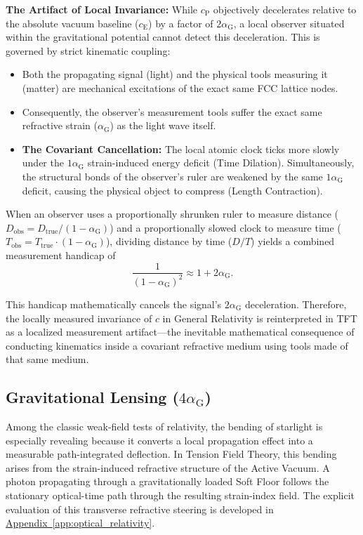 \noindent \textbf{The Artifact of Local Invariance:}
While $c_{\mathrm{P}}$ objectively decelerates relative to the absolute vacuum baseline ($c_{\mathrm{E}}$) by a factor of $2\alpha_{\mathrm{G}}$, a local observer situated within the gravitational potential cannot detect this deceleration. This is governed by strict kinematic coupling:
\begin{itemize}
    \item Both the propagating signal (light) and the physical tools measuring it (matter) are mechanical excitations of the exact same FCC lattice nodes.
    \item Consequently, the observer's measurement tools suffer the exact same refractive strain ($\alpha_{\mathrm{G}}$) as the light wave itself.
    \item \textbf{The Covariant Cancellation:} The local atomic clock ticks more slowly under the $1\alpha_{\mathrm{G}}$ strain-induced energy deficit (Time Dilation). Simultaneously, the structural bonds of the observer's ruler are weakened by the same $1\alpha_{\mathrm{G}}$ deficit, causing the physical object to compress (Length Contraction).
\end{itemize}

When an observer uses a proportionally shrunken ruler to measure distance ($D_{\mathrm{obs}} = D_{\mathrm{true}}/(1 - \alpha_{\mathrm{G}})$) and a proportionally slowed clock to measure time ($T_{\mathrm{obs}} = T_{\mathrm{true}}\cdot(1 - \alpha_{\mathrm{G}})$), dividing distance by time ($D/T$) yields a combined measurement handicap of
\begin{equation}
    \frac{1}{(1-\alpha_{\mathrm{G}})^2} \approx 1 + 2\alpha_{\mathrm{G}}.
\end{equation}

This handicap mathematically cancels the signal's $2\alpha_{\mathrm{G}}$ deceleration. Therefore, the locally measured invariance of $c$ in General Relativity is reinterpreted in TFT as a localized measurement artifact---the inevitable mathematical consequence of conducting kinematics inside a covariant refractive medium using tools made of that same medium.

\subsection{Gravitational Lensing ($4\alpha_{\mathrm{G}}$)}
\label{sec:gravitational_lensing}

Among the classic weak-field tests of relativity, the bending of starlight is especially revealing because it converts a local propagation effect into a measurable path-integrated deflection. In Tension Field Theory, this bending arises from the strain-induced refractive structure of the Active Vacuum. A photon propagating through a gravitationally loaded Soft Floor follows the stationary optical-time path through the resulting strain-index field. The explicit evaluation of this transverse refractive steering is developed in \hyperref[app:optical_relativity]{Appendix~\ref*{app:optical_relativity}}.


